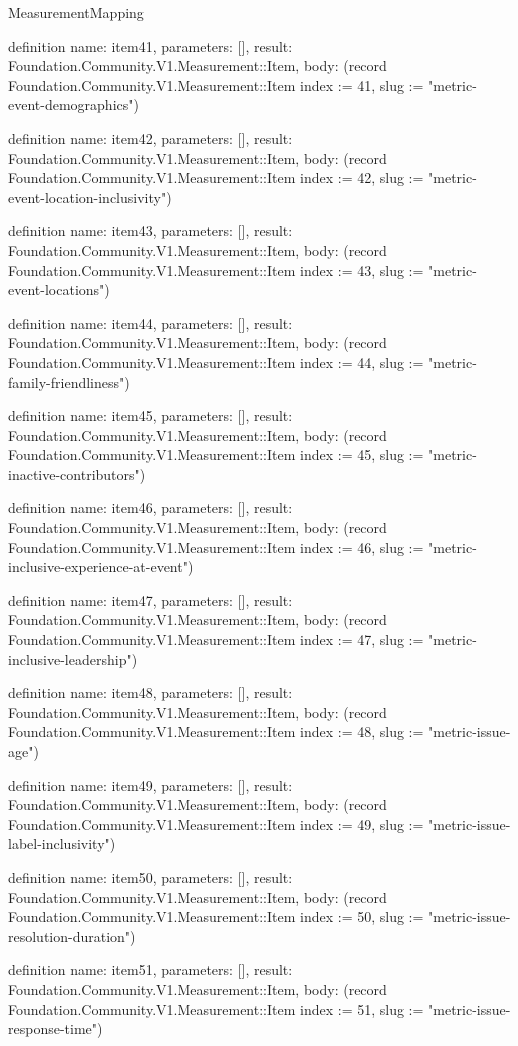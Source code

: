 \begin{lexlean}{MeasurementMapping}
\begin{semanticmodule}
definition{
  name: item41,
  parameters: [],
  result: Foundation.Community.V1.Measurement::Item,
  body: (record Foundation.Community.V1.Measurement::Item {index := 41, slug := "metric-event-demographics"})
}

definition{
  name: item42,
  parameters: [],
  result: Foundation.Community.V1.Measurement::Item,
  body: (record Foundation.Community.V1.Measurement::Item {index := 42, slug := "metric-event-location-inclusivity"})
}

definition{
  name: item43,
  parameters: [],
  result: Foundation.Community.V1.Measurement::Item,
  body: (record Foundation.Community.V1.Measurement::Item {index := 43, slug := "metric-event-locations"})
}

definition{
  name: item44,
  parameters: [],
  result: Foundation.Community.V1.Measurement::Item,
  body: (record Foundation.Community.V1.Measurement::Item {index := 44, slug := "metric-family-friendliness"})
}

definition{
  name: item45,
  parameters: [],
  result: Foundation.Community.V1.Measurement::Item,
  body: (record Foundation.Community.V1.Measurement::Item {index := 45, slug := "metric-inactive-contributors"})
}

definition{
  name: item46,
  parameters: [],
  result: Foundation.Community.V1.Measurement::Item,
  body: (record Foundation.Community.V1.Measurement::Item {index := 46, slug := "metric-inclusive-experience-at-event"})
}

definition{
  name: item47,
  parameters: [],
  result: Foundation.Community.V1.Measurement::Item,
  body: (record Foundation.Community.V1.Measurement::Item {index := 47, slug := "metric-inclusive-leadership"})
}

definition{
  name: item48,
  parameters: [],
  result: Foundation.Community.V1.Measurement::Item,
  body: (record Foundation.Community.V1.Measurement::Item {index := 48, slug := "metric-issue-age"})
}

definition{
  name: item49,
  parameters: [],
  result: Foundation.Community.V1.Measurement::Item,
  body: (record Foundation.Community.V1.Measurement::Item {index := 49, slug := "metric-issue-label-inclusivity"})
}

definition{
  name: item50,
  parameters: [],
  result: Foundation.Community.V1.Measurement::Item,
  body: (record Foundation.Community.V1.Measurement::Item {index := 50, slug := "metric-issue-resolution-duration"})
}

definition{
  name: item51,
  parameters: [],
  result: Foundation.Community.V1.Measurement::Item,
  body: (record Foundation.Community.V1.Measurement::Item {index := 51, slug := "metric-issue-response-time"})
}


\end{semanticmodule}
\end{lexlean}
